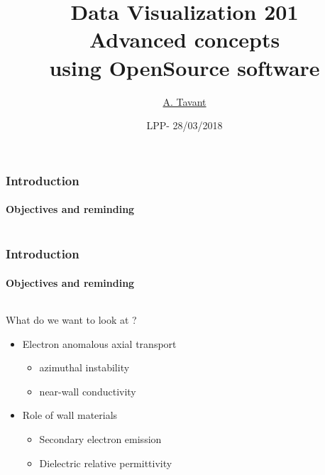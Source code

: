 \documentclass[sans, aspectratio=169]{beamer}
\title{
\textbf{{\LARGE Data Visualization 201}}\\
Advanced concepts \\ using OpenSource software
}
\date{LPP- 28/03/2018}
\author{\underline{A. Tavant}}
\begin{document}
\begin{frame}
\titlepage
\end{frame}

\begin{frame} 
	\frametitle{Introduction} 
	\framesubtitle{Objectives and reminding} 

	\begin{columns}
		\begin{column}{0.5\linewidth}

		\end{column}
		
		\begin{column}{0.55\linewidth}

		
		\end{column}
		
	\end{columns}
\end{frame}



\begin{frame} 
	\frametitle{Introduction} 
	\framesubtitle{Objectives and reminding} 

	\begin{columns}
		\begin{column}{0.55\linewidth}
		What do we want to look at ?
			\begin{itemize}
			\item Electron anomalous axial transport
			\begin{itemize}
				\item azimuthal instability \footnotemark[1]
				\item near-wall conductivity
			\end{itemize}						
			\item Role of wall materials \footnotemark[2]
			\begin{itemize}
				\item Secondary electron emission
				\item Dielectric relative permittivity
			\end{itemize}			
			\end{itemize}
		\end{column}
		
		\begin{column}{0.45\linewidth}
		
		
		\end{column}
		
	\end{columns}
\end{frame}
\end{document}
